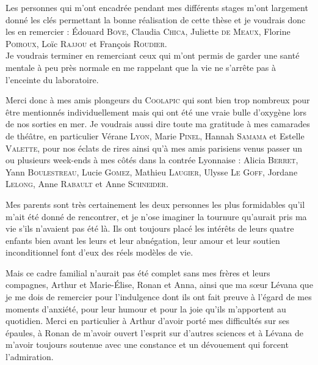 Les personnes qui m'ont encadrée pendant mes différents stages m'ont largement donné les clés permettant la bonne réalisation de cette thèse et je voudrais donc les en remercier : 
\'Edouard \textsc{Bove},
Claudia \textsc{Chica},
Juliette \textsc{de Meaux},
Florine \textsc{Poiroux},
Loïc \textsc{Rajjou} et
François \textsc{Roudier}.\\








Je voudrais terminer en remerciant ceux qui m'ont permis de garder une santé mentale à peu près normale en me rappelant que la vie ne s'arrête pas à l'enceinte du laboratoire.

Merci donc à mes amis plongeurs du \textsc{Coolapic} qui sont bien trop nombreux pour être mentionnés individuellement mais qui ont été une vraie bulle d'oxygène lors de nos sorties en mer.
Je voudrais aussi dire toute ma gratitude à mes camarades de thé\^atre, en particulier Vérane \textsc{Lyon}, Marie \textsc{Pinel}, Hannah \textsc{Samama} et Estelle \textsc{Valette}, pour nos éclats de rires ainsi qu'à mes amis parisiens venus passer un ou plusieurs week-ends à mes côtés dans la contrée Lyonnaise : Alicia \textsc{Berret}, Yann \textsc{Boulestreau}, Lucie \textsc{Gomez}, Mathieu \textsc{Laugier}, Ulysse \textsc{Le Goff}, Jordane \textsc{Lelong}, Anne \textsc{Rabault} et Anne \textsc{Schneider}.


Mes parents sont très certainement les deux personnes les plus formidables qu'il m'ait été donné de rencontrer, et je n'ose imaginer la tournure qu'aurait pris ma vie s'ils n'avaient pas été là.
Ils ont toujours placé les intérêts de leurs quatre enfants bien avant les leurs et leur abnégation, leur amour et leur soutien inconditionnel font d'eux des réels modèles de vie.


Mais ce cadre familial n'aurait pas été complet sans mes frères et leurs compagnes, Arthur et Marie-\'Elise, Ronan et Anna, ainsi que ma sœur Lévana que je me dois de remercier pour l'indulgence dont ils ont fait preuve à l'égard de mes moments d'anxiété, pour leur humour et pour la joie qu'ils m'apportent au quotidien.
Merci en particulier à Arthur d'avoir porté mes difficultés sur ses épaules, à Ronan de m'avoir ouvert l'esprit sur d'autres sciences et à Lévana de m'avoir toujours soutenue avec une constance et un dévouement qui forcent l'admiration.

